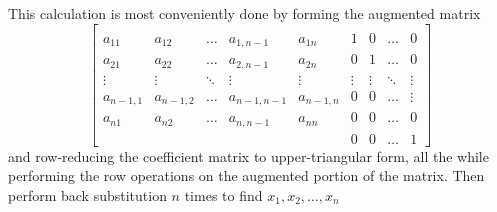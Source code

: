 \documentclass[../main.tex]{subfiles}
\begin{document}
This calculation is most conveniently done by forming the augmented matrix
$$
\left[\begin{array}{ccccc|cccc}
& & & & & & & \\
a_{11} & a_{12} & \ldots & a_{1, n-1} & a_{1 n} & 1 & 0 & \ldots & 0 \\
a_{21} & a_{22} & \ldots & a_{2, n-1} & a_{2 n} & 0 & 1 & \ldots & 0 \\
\vdots & \vdots & \ddots & \vdots & \vdots & \vdots & \vdots & \ddots & \vdots \\
a_{n-1,1} & a_{n-1,2} & \ldots & a_{n-1, n-1} & a_{n-1, n} & 0 & 0 & \ldots & \vdots \\
a_{n 1} & a_{n 2} & \ldots & a_{n, n-1} & a_{n n} & 0 & 0 & \ldots & 0 \\
& & & & & 0 & 0 & \ldots & 1
\end{array}\right]
$$
and row-reducing the coefficient matrix to upper-triangular form, all the while performing the row operations on the augmented portion of the matrix. Then perform back substitution $n$ times to find $x_{1}, x_{2}, \ldots, x_{n}$
\end{document}
